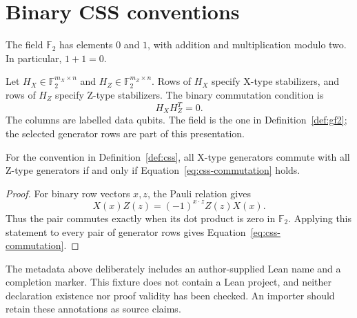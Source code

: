 \section{Binary CSS conventions}
\label{sec:foundations}

\begin{definition}
\label{def:gf2}
The field $\mathbb{F}_2$ has elements $0$ and $1$, with addition and
multiplication modulo two. In particular, $1+1=0$.
\end{definition}

\begin{definition}
\label{def:css}
Let $H_X\in\mathbb{F}_2^{m_X\times n}$ and
$H_Z\in\mathbb{F}_2^{m_Z\times n}$. Rows of $H_X$ specify X-type
stabilizers, and rows of $H_Z$ specify Z-type stabilizers. The binary
commutation condition is
\begin{equation}
\label{eq:css-commutation}
H_X H_Z^{T}=0.
\end{equation}
The columns are labelled data qubits. The field is the one in
Definition~\ref{def:gf2}; the selected generator rows are part of this
presentation.
\end{definition}

\begin{lem}
\label{lem:css-commutation}
\leanok
For the convention in Definition~\ref{def:css}, all X-type generators
commute with all Z-type generators if and only if
Equation~\eqref{eq:css-commutation} holds.
\end{lem}

\begin{proof}
\label{proof:css-commutation}
For binary row vectors $x,z$, the Pauli relation gives
\begin{equation*}
X(x)Z(z)=(-1)^{x\cdot z}Z(z)X(x).
\end{equation*}
Thus the pair commutes exactly when its dot product is zero in
$\mathbb{F}_2$. Applying this statement to every pair of generator rows
gives Equation~\eqref{eq:css-commutation}.
\end{proof}

\begin{remarkstar}
\label{rem:source-only}
The metadata above deliberately includes an author-supplied Lean name
and a completion marker. This fixture does not contain a Lean project,
and neither declaration existence nor proof validity has been checked.
An importer should retain these annotations as source claims.
\end{remarkstar}
